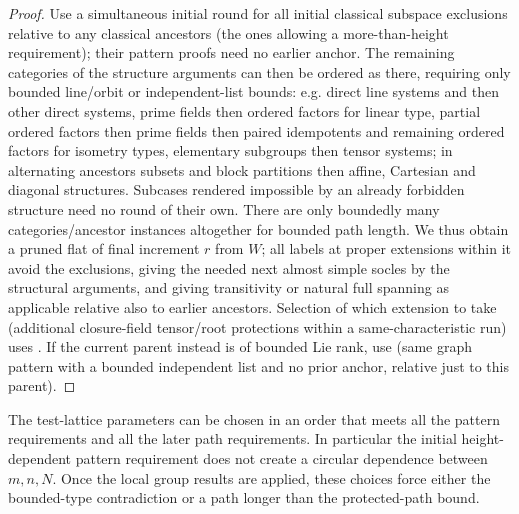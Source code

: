 \begin{proof}
Use a simultaneous initial round for all initial classical subspace exclusions relative to any classical ancestors (the ones allowing a more-than-height requirement); their pattern proofs need no earlier anchor. The remaining categories of the structure arguments can then be ordered as there, requiring only bounded line/orbit or independent-list bounds: e.g. direct line systems and then other direct systems, prime fields then ordered factors for linear type, partial ordered factors then prime fields then paired idempotents and remaining ordered factors for isometry types, elementary subgroups then tensor systems; in alternating ancestors subsets and block partitions then affine, Cartesian and diagonal structures. Subcases rendered impossible by an already forbidden structure need no round of their own. There are only boundedly many categories/ancestor instances altogether for bounded path length. We thus obtain a pruned flat of final increment \(r\) from \(W\); all labels at proper extensions within it avoid the exclusions, giving the needed next almost simple socles by the structural arguments, and giving transitivity or natural full spanning as applicable relative also to earlier ancestors. Selection of which extension to take (additional closure-field tensor/root protections within a same-characteristic run) uses . If the current parent instead is of bounded Lie rank, use  (same graph pattern with a bounded independent list and no prior anchor, relative just to this parent).
\end{proof}

\begin{proposition}\label{c:parameter-order}
The test-lattice parameters can be chosen in an order that meets all the pattern requirements and all the later path requirements. In particular the initial height-dependent pattern requirement does not create a circular dependence between \(m,n,N\). Once the local group results are applied, these choices force either the bounded-type contradiction or a path longer than the protected-path bound.
\end{proposition}

